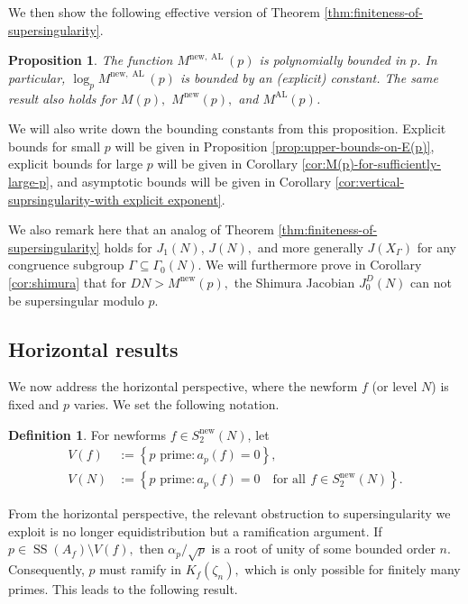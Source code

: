 \documentclass[11pt,letterpaper,reqno]{amsart}
\newtheorem{proposition}[theorem]{Proposition}
\theoremstyle{definition}
\newtheorem{definition}[theorem]{Definition}
\numberwithin{equation}{section}
\numberwithin{figure}{section}
\numberwithin{table}{section}
\let\subsectiontemp\subsection
\renewcommand{\subsection}[1]{ 
    \subsectiontemp{#1} \hfill\vspace{0.5\linespacing} 
}
\newcommand{\nw}{\mathrm{new}}
\begin{document}
We then show the following effective version of Theorem \ref{thm:finiteness-of-supersingularity}.

\begin{proposition}\label{prop:intro-vertical}
    The function $M^{\nw, \operatorname{AL}}(p)$ is polynomially bounded in $p$. In particular, $\log_p M^{\nw, \operatorname{AL}}(p)$ is bounded by an (explicit) constant. The same result also holds for $M(p),$ $M^\nw(p),$ and $M^{\operatorname{AL}}(p)$.
\end{proposition}
We will also write down the bounding constants from this proposition. Explicit bounds for small $p$ will be given in Proposition \ref{prop:upper-bounds-on-E(p)}, explicit bounds for large $p$ will be given in Corollary \ref{cor:M(p)-for-sufficiently-large-p}, and asymptotic bounds will be given in Corollary \ref{cor:vertical-suprsingularity-with explicit exponent}.

We also remark here that an analog of Theorem \ref{thm:finiteness-of-supersingularity} holds for $J_1(N)$, $J(N),$ and more generally $J(X_\Gamma)$ for any congruence subgroup $\Gamma \subseteq \Gamma_0(N)$. We will furthermore prove in Corollary \ref{cor:shimura}  that for $DN > M^{\nw}(p),$ the Shimura Jacobian $J_0^D(N)$ can not be supersingular modulo $p$.



\subsection{Horizontal results} \label{subsection:horizontal-results}

We now address the horizontal perspective, where the newform $f$ (or level $N$) is fixed and $p$ varies. We set the following notation.

\begin{definition}
    For newforms $f \in S_2^{\nw}(N)$, let
    \begin{align}
        V(f) &:= \left\{ \text{$p$ prime} : a_p(f) = 0  \right\},\\
        V(N) &:= \left\{ \text{$p$ prime} : a_p(f) = 0 \quad \text{for all}\ \, f \in S_2^\nw(N) \right\}.
    \end{align}
\end{definition}

From the horizontal perspective, the relevant obstruction to supersingularity we exploit is no longer equidistribution but a ramification argument. If $p \in \operatorname{SS}(A_f) \setminus V(f),$ then $\alpha_p/\!\sqrt{p}$ is a root of unity of some bounded order $n$. Consequently, $p$ must ramify in $K_f(\zeta_n),$ which is only possible for finitely many primes. This leads to the following result.
\end{document}
